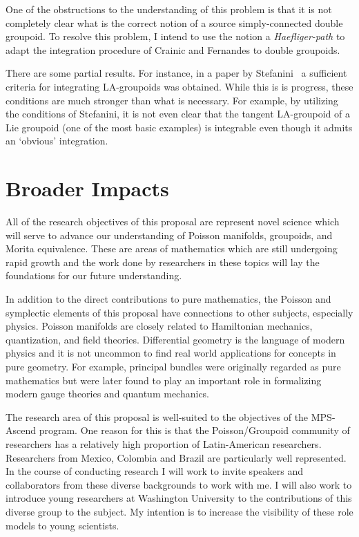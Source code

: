 \documentclass[11pt, letterpaper]{article}
\begin{document}
One of the obstructions to the understanding of this problem is that it is not completely clear what is the correct notion of a source simply-connected double groupoid. To resolve this problem, I intend to use the notion a \emph{Haefliger-path} to adapt the integration procedure of Crainic and Fernandes to double groupoids.

There are some partial results. For instance, in a paper by Stefanini~\cite{Stefanini} a sufficient criteria for integrating LA-groupoids was obtained. While this is is progress, these conditions are much stronger than what is necessary. For example, by utilizing the conditions of Stefanini, it is not even clear that the tangent LA-groupoid of a Lie groupoid (one of the most basic examples) is integrable even though it admits an `obvious' integration.
\section{Broader Impacts}\label{section:BroaderImpacts}
All of the research objectives of this proposal are represent novel science which will serve to advance our understanding of Poisson manifolds, groupoids, and Morita equivalence. These are areas of mathematics which are still undergoing rapid growth and the work done by researchers in these topics will lay the foundations for our future understanding.

In addition to the direct contributions to pure mathematics, the Poisson and symplectic elements of this proposal have connections to other subjects, especially physics. Poisson manifolds are closely related to Hamiltonian mechanics, quantization, and field theories. Differential geometry is the language of modern physics and it is not uncommon to find real world applications for concepts in pure geometry. For example, principal bundles were originally regarded as pure mathematics but were later found to play an important role in formalizing modern gauge theories and quantum mechanics.

The research area of this proposal is well-suited to the objectives of the MPS-Ascend program. One reason for this is that the Poisson/Groupoid community of researchers has a relatively high proportion of Latin-American researchers. Researchers from Mexico, Colombia and Brazil are particularly well represented. In the course of conducting research I will work to invite speakers and collaborators from these diverse backgrounds to work with me. I will also work to introduce young researchers at Washington University to the contributions of this diverse group to the subject. My intention is to increase the visibility of these role models to young scientists.
\end{document}
